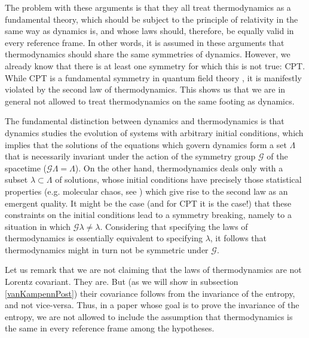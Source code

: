\documentclass[twocolumn,usenatbib]{mnras2}
\begin{document}
The problem with these arguments is that they all treat thermodynamics as a fundamental theory, which should be subject to the principle of relativity in the same way as dynamics is, and whose laws should, therefore, be equally valid in every reference frame. In other words, it is assumed in these arguments that thermodynamics should share the same symmetries of dynamics. However, we already know that there is at least one symmetry for which this is not true: CPT. While CPT is a fundamental symmetry in quantum field theory \citep{Weinberg_QFT_1995}, it is manifestly violated by the second law of thermodynamics. This shows us that we are in general not allowed to treat thermodynamics on the same footing as dynamics. 

The fundamental distinction between dynamics and thermodynamics is that dynamics studies the evolution of systems with arbitrary initial conditions, which implies that the solutions of the equations which govern dynamics form a set $\Lambda$ that is necessarily invariant under the action of the symmetry group $\mathcal{G}$ of the spacetime ($\mathcal{G}\Lambda = \Lambda$).
On the other hand, thermodynamics deals only with a subset $\lambda \subset \Lambda$ of solutions, whose initial conditions have precisely those statistical properties (e.g. molecular chaos, see \citealt{huang_book}) which give rise to the second law as an emergent quality. It might be the case (and for CPT it is the case!) that these constraints on the initial conditions lead to a symmetry breaking, namely to a situation in which $\mathcal{G} \lambda \neq \lambda$. Considering that specifying the laws of thermodynamics is essentially equivalent to specifying $\lambda$, it follows that thermodynamics might in turn not be symmetric under $\mathcal{G}$. 

Let us remark that we are not claiming that the laws of thermodynamics are not Lorentz covariant. They are. But (as we will show in subsection \ref{vanKampennPost}) their covariance follows from the invariance of the entropy, and not vice-versa. Thus, in a paper whose goal is to prove the invariance of the entropy, we are not allowed to include the assumption that thermodynamics is the same in every reference frame among the hypotheses. 
\end{document}
